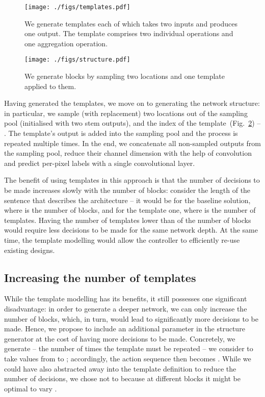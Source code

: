 \documentclass[10pt,twocolumn,letterpaper]{article}
\begin{document}
\begin{figure}[t]
	\begin{center}
		\texttt{[image: ./figs/templates.pdf]}
	\end{center}
	\caption{We generate  templates each of which takes two inputs and produces one output. The template comprises two individual operations and one aggregation operation.\label{fig:template}}
\end{figure}

\begin{figure}[t]
	\begin{center}
		\texttt{[image: ./figs/structure.pdf]}
	\end{center}
	\caption{We generate  blocks by sampling two locations and one template applied to them.
		\label{fig:structure}}
\end{figure}

Having generated the templates, we move on to generating the network structure: in particular, we sample (with replacement) two locations out of the sampling pool (initialised with two stem outputs), and the index of the template~(Fig.~\ref{fig:structure}) -- . The template's output is added into the sampling pool and the process is repeated multiple times. In the end, we concatenate all non-sampled outputs from the sampling pool, reduce their channel dimension with the help of  convolution and predict per-pixel labels with a single  convolutional layer.

The benefit of using templates in this approach is that the number of decisions to be made increases slowly with the number of blocks: \eg consider the length of the sentence that describes the architecture -- it would be  for the baseline solution, where  is the number of blocks, and  for the template one, where  is the number of templates. Having the number of templates lower than  of the number of blocks would require less decisions to be made for the same network depth. At the same time, the template modelling would allow the controller to efficiently re-use existing designs.

\subsection{Increasing the number of templates}
\label{ints}

While the template modelling has its benefits, it still possesses one significant disadvantage: in order to generate a deeper network, we can only increase the number of blocks, which, in turn, would lead to significantly more decisions to be made. Hence, we propose to include an additional parameter in the structure generator at the cost of having  more decisions to be made. Concretely, we generate  -- the number of times the template must be repeated -- we consider  to take values from  to ; accordingly, the action sequence then becomes . While we could have also abstracted away  into the template definition to reduce the number of decisions, we chose not to because at different blocks it might be optimal to vary .
\end{document}
